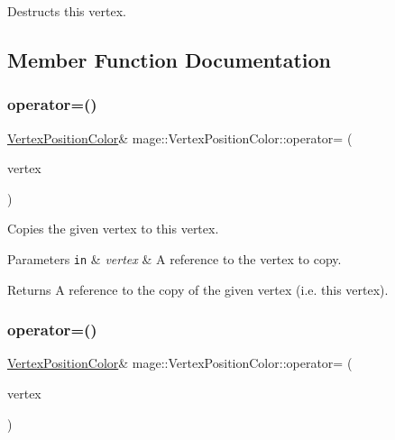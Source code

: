 Destructs this vertex. 

\subsection{Member Function Documentation}
\hypertarget{structmage_1_1_vertex_position_color_aa621ed54ab2eee82d636a5805db5d28b}{}\label{structmage_1_1_vertex_position_color_aa621ed54ab2eee82d636a5805db5d28b} 
\subsubsection{\texorpdfstring{operator=()}{operator=()}\hspace{0.1cm}{\footnotesize\ttfamily [1/2]}}
{\footnotesize\ttfamily \hyperlink{structmage_1_1_vertex_position_color}{Vertex\+Position\+Color}\& mage\+::\+Vertex\+Position\+Color\+::operator= (\begin{DoxyParamCaption}\item[{const \hyperlink{structmage_1_1_vertex_position_color}{Vertex\+Position\+Color} \&}]{vertex }\end{DoxyParamCaption})\hspace{0.3cm}{\ttfamily [default]}}

Copies the given vertex to this vertex.


\begin{DoxyParams}[1]{Parameters}
\mbox{\tt in}  & {\em vertex} & A reference to the vertex to copy. \\
\hline
\end{DoxyParams}
\begin{DoxyReturn}{Returns}
A reference to the copy of the given vertex (i.\+e. this vertex). 
\end{DoxyReturn}
\hypertarget{structmage_1_1_vertex_position_color_a2c78f670a027a3891266dba88bfe9e87}{}\label{structmage_1_1_vertex_position_color_a2c78f670a027a3891266dba88bfe9e87} 
\subsubsection{\texorpdfstring{operator=()}{operator=()}\hspace{0.1cm}{\footnotesize\ttfamily [2/2]}}
{\footnotesize\ttfamily \hyperlink{structmage_1_1_vertex_position_color}{Vertex\+Position\+Color}\& mage\+::\+Vertex\+Position\+Color\+::operator= (\begin{DoxyParamCaption}\item[{\hyperlink{structmage_1_1_vertex_position_color}{Vertex\+Position\+Color} \&\&}]{vertex }\end{DoxyParamCaption})\hspace{0.3cm}{\ttfamily [default]}}

